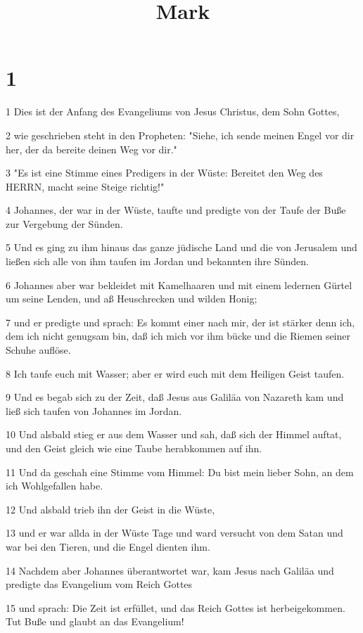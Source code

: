

\title{Mark}


\chapter{1}

\par 1 Dies ist der Anfang des Evangeliums von Jesus Christus, dem Sohn Gottes,
\par 2 wie geschrieben steht in den Propheten: "Siehe, ich sende meinen Engel vor dir her, der da bereite deinen Weg vor dir."
\par 3 "Es ist eine Stimme eines Predigers in der Wüste: Bereitet den Weg des HERRN, macht seine Steige richtig!"
\par 4 Johannes, der war in der Wüste, taufte und predigte von der Taufe der Buße zur Vergebung der Sünden.
\par 5 Und es ging zu ihm hinaus das ganze jüdische Land und die von Jerusalem und ließen sich alle von ihm taufen im Jordan und bekannten ihre Sünden.
\par 6 Johannes aber war bekleidet mit Kamelhaaren und mit einem ledernen Gürtel um seine Lenden, und aß Heuschrecken und wilden Honig;
\par 7 und er predigte und sprach: Es kommt einer nach mir, der ist stärker denn ich, dem ich nicht genugsam bin, daß ich mich vor ihm bücke und die Riemen seiner Schuhe auflöse.
\par 8 Ich taufe euch mit Wasser; aber er wird euch mit dem Heiligen Geist taufen.
\par 9 Und es begab sich zu der Zeit, daß Jesus aus Galiläa von Nazareth kam und ließ sich taufen von Johannes im Jordan.
\par 10 Und alsbald stieg er aus dem Wasser und sah, daß sich der Himmel auftat, und den Geist gleich wie eine Taube herabkommen auf ihn.
\par 11 Und da geschah eine Stimme vom Himmel: Du bist mein lieber Sohn, an dem ich Wohlgefallen habe.
\par 12 Und alsbald trieb ihn der Geist in die Wüste,
\par 13 und er war allda in der Wüste Tage und ward versucht von dem Satan und war bei den Tieren, und die Engel dienten ihm.
\par 14 Nachdem aber Johannes überantwortet war, kam Jesus nach Galiläa und predigte das Evangelium vom Reich Gottes
\par 15 und sprach: Die Zeit ist erfüllet, und das Reich Gottes ist herbeigekommen. Tut Buße und glaubt an das Evangelium!
